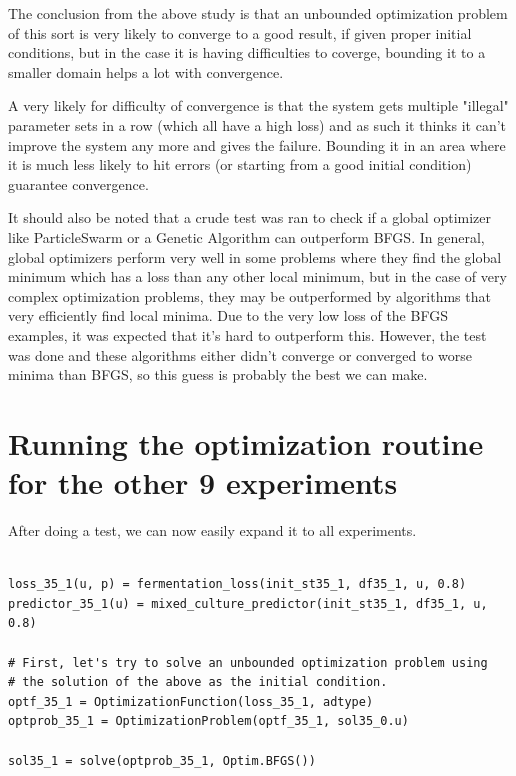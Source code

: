 \documentclass[11pt]{article}
\begin{document}
The conclusion from the above study is that an unbounded optimization problem of this sort is very likely to converge to a good result, if given proper initial conditions, but in the case it is having difficulties to coverge, bounding it to a smaller domain helps a lot with convergence.

A very likely for difficulty of convergence is that the system gets multiple "illegal" parameter sets in a row (which all have a high loss) and as such it thinks it can't improve the system any more and gives the failure. Bounding it in an area where it is much less likely to hit errors (or starting from a good initial condition) guarantee convergence.

It should also be noted that a crude test was ran to check if a global optimizer like ParticleSwarm or a Genetic Algorithm can outperform BFGS. In general, global optimizers perform very well in some problems where they find the global minimum which has a loss than any other local minimum, but in the case of very complex optimization problems, they may be outperformed by algorithms that very efficiently find local minima. Due to the very low loss of the BFGS examples, it was expected that it's hard to outperform this. However, the test was done and these algorithms either didn't converge or converged to worse minima than BFGS, so this guess is probably the best we can make.

\section{Running the optimization routine for the other 9 experiments}
\label{sec:orgd5fdec8}
After doing a test, we can now easily expand it to all experiments.

\begin{verbatim}

loss_35_1(u, p) = fermentation_loss(init_st35_1, df35_1, u, 0.8)
predictor_35_1(u) = mixed_culture_predictor(init_st35_1, df35_1, u, 0.8)

# First, let's try to solve an unbounded optimization problem using
# the solution of the above as the initial condition.
optf_35_1 = OptimizationFunction(loss_35_1, adtype)
optprob_35_1 = OptimizationProblem(optf_35_1, sol35_0.u)

sol35_1 = solve(optprob_35_1, Optim.BFGS())
\end{verbatim}
\end{document}
